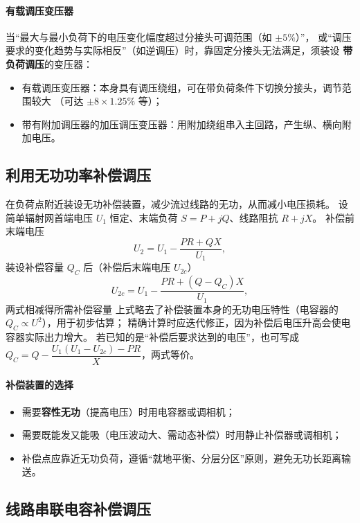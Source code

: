 \paragraph{有载调压变压器}
当“最大与最小负荷下的电压变化幅度超过分接头可调范围（如 $\pm5\%$）”，
或“调压要求的变化趋势与实际相反”（如逆调压）时，靠固定分接头无法满足，须装设
\textbf{带负荷调压}的变压器：
\begin{itemize}
  \item 有载调压变压器：本身具有调压绕组，可在带负荷条件下切换分接头，调节范围较大
        （可达 $\pm8\times1.25\%$ 等）；
  \item 带有附加调压器的加压调压变压器：用附加绕组串入主回路，产生纵、横向附加电压。
\end{itemize}

\subsection{利用无功功率补偿调压}

在负荷点附近装设无功补偿装置，减少流过线路的无功，从而减小电压损耗。
设简单辐射网首端电压 $U_1$ 恒定、末端负荷 $S=P+jQ$、线路阻抗 $R+jX$。
补偿前末端电压
\begin{equation}
  U_2=U_1-\frac{PR+QX}{U_1},
\end{equation}
装设补偿容量 $Q_C$ 后（补偿后末端电压 $U_{2c}$）
\begin{equation}
  U_{2c}=U_1-\frac{PR+\left(Q-Q_C\right)X}{U_1},
\end{equation}
两式相减得所需补偿容量
上式略去了补偿装置本身的无功电压特性（电容器的 $Q_C\propto U^{2}$），用于初步估算；
精确计算时应迭代修正，因为补偿后电压升高会使电容器实际出力增大。
若已知的是“补偿后要求达到的电压”，也可写成
$Q_C=Q-\dfrac{U_1\left(U_1-U_{2c}\right)-PR}{X}$，两式等价。

\paragraph{补偿装置的选择}
\begin{itemize}
  \item 需要\textbf{容性无功}（提高电压）时用电容器或调相机；
  \item 需要既能发又能吸（电压波动大、需动态补偿）时用静止补偿器或调相机；
  \item 补偿点应靠近无功负荷，遵循“就地平衡、分层分区”原则，避免无功长距离输送。
\end{itemize}

\subsection{线路串联电容补偿调压}

